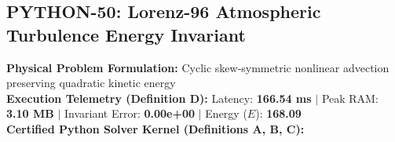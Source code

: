 \subsection{PYTHON-50: Lorenz-96 Atmospheric Turbulence Energy Invariant}
\textbf{Physical Problem Formulation:} Cyclic skew-symmetric nonlinear advection preserving quadratic kinetic energy\\
\textbf{Execution Telemetry (Definition D):} Latency: \textbf{166.54 ms} $|$ Peak RAM: \textbf{3.10 MB} $|$ Invariant Error: \textbf{0.00e+00} $|$ Energy ($E$): \textbf{168.09}\\

\textbf{Certified Python Solver Kernel (Definitions A, B, C):}


\vspace{1em}
\newpage
